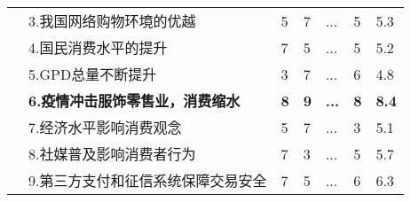 \documentclass{xjtureport}
\begin{document}
\begin{itemize}
\begin{table}[H]
\begin{tabular}{cllllll}
    \multicolumn{1}{c|}{}                                                                                                             & 3.我国网络购物环境的优越                                      & 5                                 & 7                                 & ...                                 & 5                                 & 5.3                                 \\
    \multicolumn{1}{c|}{}                                                                                                             & 4.国民消费水平的提升                                        & 7                                 & 5                                 & ...                                 & 5                                 & 5.2                                 \\
    \multicolumn{1}{c|}{}                                                                                                             & 5.GPD总量不断提升                                        & 3                                 & 7                                 & ...                                 & 6                                 & 4.8                                 \\
    \multicolumn{1}{c|}{}                                                                                                             & {\color[HTML]{FE0000} \textbf{6.疫情冲击服饰零售业，消费缩水}} & {\color[HTML]{FE0000} \textbf{8}} & {\color[HTML]{FE0000} \textbf{9}} & {\color[HTML]{FE0000} \textbf{...}} & {\color[HTML]{FE0000} \textbf{8}} & {\color[HTML]{FE0000} \textbf{8.4}} \\
    \multicolumn{1}{c|}{}                                                                                                             & 7.经济水平影响消费观念                                       & 5                                 & 7                                 & ...                                 & 3                                 & 5.1                                 \\
    \multicolumn{1}{c|}{}                                                                                                             & 8.社媒普及影响消费者行为                                      & 7                                 & 3                                 & ...                                 & 5                                 & 5.7                                 \\
    \multicolumn{1}{c|}{}                                                                                                             & 9.第三方支付和征信系统保障交易安全 & 7 & 5 & ...& 6&6.3\\

\end{tabular}
\end{table}
\end{itemize}
\end{document}
